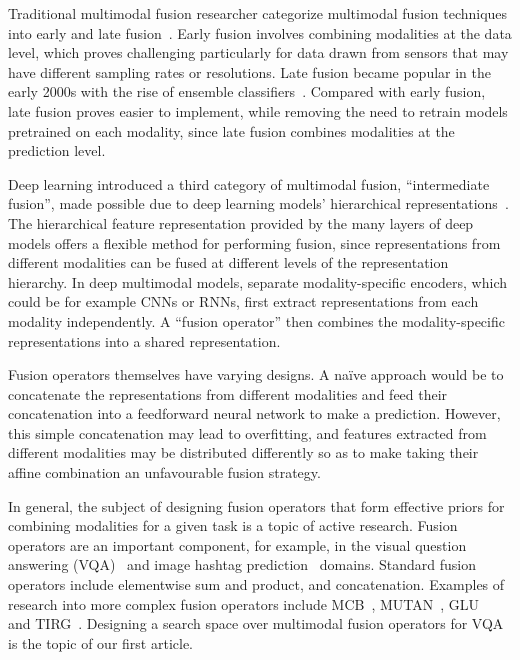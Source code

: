 Traditional multimodal fusion researcher categorize multimodal fusion
techniques into early and late fusion~\citep{ramachandram2017deepmultimodal}.
Early fusion involves combining modalities at the data level, which proves
challenging particularly for data drawn from sensors that may have different
sampling rates or resolutions.
Late fusion became popular in the early 2000s with the rise of ensemble
classifiers~\citep{kuncheva2004combining}.
Compared with early fusion, late fusion proves easier to implement, while
removing the need to retrain models pretrained on each modality, since late
fusion combines modalities at the prediction level.

Deep learning introduced a third category of multimodal fusion, ``intermediate
fusion'', made possible due to deep learning models' hierarchical
representations~\citep{ramachandram2017deepmultimodal}.
The hierarchical feature representation provided by the many layers of deep
models offers a flexible method for performing fusion, since representations
from different modalities can be fused at different levels of the
representation hierarchy.
In deep multimodal models, separate modality-specific encoders, which could be
for example CNNs or RNNs, first extract representations from each modality
independently.
A ``fusion operator'' then combines the modality-specific representations into
a shared representation.

Fusion operators themselves have varying designs. A na\"ive approach would be to
concatenate the representations from different modalities and feed their
concatenation into a feedforward neural network to make a prediction.
However, this simple concatenation may lead to overfitting, and features
extracted from different modalities may be distributed differently so as to
make taking their affine combination an unfavourable fusion strategy.

In general, the subject of designing fusion operators that form effective
priors for combining modalities for a given task is a topic of active research.
Fusion operators are an important component, for example, in the visual
question answering (VQA)~\citep{fukui2016multimodalCB} and image hashtag
prediction~\citep{durand2020learninguserreps} domains.
Standard fusion operators include elementwise sum and product, and
concatenation.
Examples of research into more complex fusion operators include
MCB~\citep{fukui2016multimodalCB}, MUTAN~\citep{ben2017mutan},
GLU~\citep{dauphin2017languagemodeling} and TIRG~\citep{vo2019composing}.
Designing a search space over multimodal fusion operators for VQA is the topic
of our first article.
